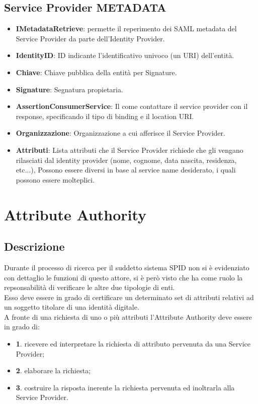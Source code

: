 \subsection{Service Provider METADATA}

\begin{itemize}
    \item \textbf{IMetadataRetrieve}: permette il reperimento dei SAML metadata del Service Provider da parte dell’Identity Provider.
    \item \textbf{IdentityID}: ID indicante l’identificativo univoco (un URI) dell’entità.
    \item \textbf{Chiave}: Chiave pubblica della entità per Signature.
    \item \textbf{Signature}: Segnatura propietaria.
    \item \textbf{AssertionConsumerService}: Il come contattare il service provider con il response, specificando il tipo di binding e il location URI.
    \item \textbf{Organizzazione}: Organizzazione a cui afferisce il Service Provider.
    \item \textbf{Attributi}: Lista attributi che il Service Provider richiede che gli vengano rilasciati dal identity provider (nome, cognome, data nascita, residenza, etc...), Possono essere diversi in base al service name desiderato, i quali possono essere molteplici.
\end{itemize}

\section{Attribute Authority}
\subsection{Descrizione}
Durante il processo di ricerca per il suddetto sistema SPID non si è evidenziato con dettaglio le funzioni di questo attore, si è però 
visto che ha come ruolo la repsonsabilità di verificare le altre due tipologie di enti.
\\ Esso deve essere in grado di certificare un determinato set di attributi relativi ad un soggetto titolare di
una identità digitale. 
\\ A fronte di una richiesta di uno o più attributi l’Attribute Authority deve essere
in grado di:
\begin{itemize}
    \item \textbf{1}. ricevere ed interpretare la richiesta di attributo pervenuta da una Service Provider;
    \item \textbf{2}. elaborare la richiesta;
    \item \textbf{3}. costruire la risposta inerente la richiesta pervenuta ed inoltrarla alla Service Provider.
\end{itemize}

